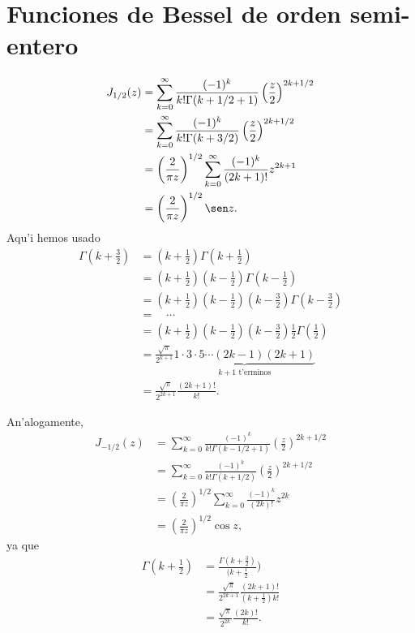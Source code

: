 \section{Funciones de Bessel de orden semi-entero}
\begin{align}
J_{1/2}(z) &= \sum_{k=0}^\infty\frac{(-1)^k}{k!\Gamma(k+1/2+1)}
\left(\frac{z}{2}\right)^{2k+1/2} \\
&= \sum_{k=0}^\infty\frac{(-1)^k}{k!\Gamma(k+3/2)}
\left(\frac{z}{2}\right)^{2k+1/2} \\
&= \left(\frac{2}{\pi z}\right)^{1/2} \sum_{k=0}^\infty \frac{(-1)^k}
{(2k+1)!} z^{2k+1} \\
&= \left(\frac{2}{\pi z}\right)^{1/2} \sen z. \label{J1/2}
\end{align}
Aqu'i hemos usado
\begin{align}
\Gamma(k+\frac{3}{2}) &= (k+\frac{1}{2})\Gamma(k+\frac{1}{2}) \\
&= (k+\frac{1}{2})(k-\frac{1}{2})\Gamma(k-\frac{1}{2}) \\
&=  (k+\frac{1}{2})(k-\frac{1}{2})(k-\frac{3}{2})\Gamma(k-\frac{3}{2}) \\
&= \quad \cdots \\
&=  (k+\frac{1}{2})(k-\frac{1}{2})(k-\frac{3}{2})\frac{1}{2}\Gamma(\frac{1}{2}) \\
&= \frac{\sqrt{\pi}}{2^{k+1}} \underbrace{1\cdot 3\cdot 5\cdots (2k-1)(2k+1)}_{k+1\text{ t'erminos}} \\
&= \frac{\sqrt{\pi}}{2^{2k+1}}\frac{(2k+1)!}{k!}.
\end{align}

An'alogamente,
\begin{align}
J_{-1/2}(z) &= \sum_{k=0}^\infty\frac{(-1)^k}{k!\Gamma(k-1/2+1)}
\left(\frac{z}{2}\right)^{2k+1/2} \\
&= \sum_{k=0}^\infty\frac{(-1)^k}{k!\Gamma(k+1/2)}
\left(\frac{z}{2}\right)^{2k+1/2} \\
&= \left(\frac{2}{\pi z}\right)^{1/2} \sum_{k=0}^\infty \frac{(-1)^k}
{(2k)!} z^{2k} \\
&= \left(\frac{2}{\pi z}\right)^{1/2} \cos z, \label{J-1/2}
\end{align}
ya que
\begin{align}
\Gamma(k+\frac{1}{2}) &= \frac{\Gamma(k+\frac{3}{2})}{(k+\frac{1}{2}}) \\
&= \frac{\sqrt{\pi}}{2^{2k+1}}\frac{(2k+1)!}{(k+\frac{1}{2})k!}\\
&= \frac{\sqrt{\pi}}{2^{2k}}\frac{(2k)!}{k!}.
\end{align}

